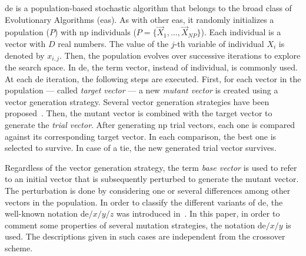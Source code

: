 \documentclass[preprint,3p]{elsarticle}
\newcommand{\EAS}{{\sc ea}s}
\newcommand{\DE}{{\sc de}}
\newcommand{\NP}{{\sc np}}
\begin{document}
\DE{} is a population-based stochastic algorithm that belongs to the broad class of Evolutionary Algorithms (\EAS{}).
%
As with other \EAS{}, it randomly initializes a population ($P$) with \NP{} individuals ($P = \{\vec{X}_1, ..., \vec{X}_{NP}\}$).
%
Each individual is a vector with $D$ real numbers.
%
The value of the $j$-th variable of individual $X_i$ is denoted by $x_{i,j}$.
%
Then, the population evolves over successive iterations to explore the search space.
%
In \DE{}, the term vector, instead of individual, is commonly used.
%
%
%
%
%
%
%
%
%
At each \DE{} iteration, the following steps are executed.
%
First, for each vector in the population --- called \textit{target vector} --- a new \emph{mutant vector} is created using a
vector generation strategy.
%
Several vector generation strategies have been proposed~\cite{Price:05,Neri:10}.
%
Then, the mutant vector is combined with the target vector to generate the \textit{trial vector}.
%
After generating \NP{} trial vectors, each one is compared against its corresponding target vector.
%
In each comparison, the best one is selected to survive.
%
%
In case of a tie, the new generated trial vector survives.

Regardless of the vector generation strategy, the term \textit{base vector} is used to refer to an initial vector that is subsequently
perturbed to generate the mutant vector.
%
The perturbation is done by considering one or several differences among other vectors in the population.
%
In order to classify the different variants of \DE{}, the well-known notation \DE{}$/x/y/z$ was introduced in~\cite{Storn:97}.
%
%
%
%
%
In this paper, in order to comment some properties of several mutation strategies, the notation \DE{}$/x/y$ is used.
%
The descriptions given in such cases are independent from the crossover scheme.
\end{document}
